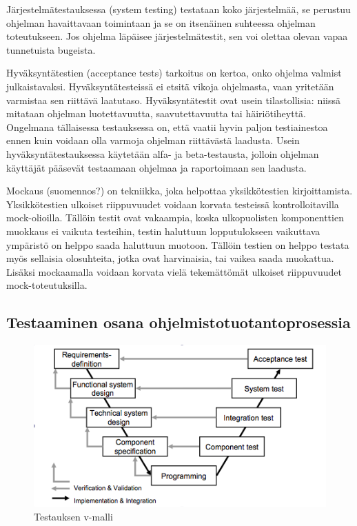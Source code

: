 Järjestelmätestauksessa (system testing) testataan koko järjestelmää, se perustuu ohjelman havaittavaan toimintaan ja se on itsenäinen suhteessa ohjelman toteutukseen. Jos ohjelma läpäisee järjestelmätestit, sen voi olettaa olevan vapaa tunnetuista bugeista. \cite[418-421]{testing}

Hyväksyntätestien (acceptance tests) tarkoitus on kertoa, onko ohjelma valmist julkaistavaksi. Hyväksyntätesteissä ei etsitä vikoja ohjelmasta, vaan yritetään varmistaa sen riittävä laatutaso. Hyväksyntätestit ovat usein tilastollisia: niissä mitataan ohjelman luotettavuutta, saavutettavuutta tai häiriötiheyttä. Ongelmana tällaisessa testauksessa on, että vaatii hyvin paljon testiainestoa ennen kuin voidaan olla varmoja ohjelman riittävästä laadusta. Usein hyväksyntätestauksessa käytetään alfa- ja beta-testausta, jolloin ohjelman käyttäjät pääsevät testaamaan ohjelmaa ja raportoimaan sen laadusta. \cite[421-423]{testing}

Mockaus (suomennos?) on tekniikka, joka helpottaa yksikkötestien kirjoittamista. Yksikkötestien ulkoiset riippuvuudet voidaan korvata testeissä kontrolloitavilla mock-olioilla. Tällöin testit ovat vakaampia, koska ulkopuolisten komponenttien muokkaus ei vaikuta testeihin, testin haluttuun lopputulokseen vaikuttava ympäristö on helppo saada haluttuun muotoon. Tällöin testien on helppo testata myös sellaisia olosuhteita, jotka ovat harvinaisia, tai vaikea saada muokattua. Lisäksi mockaamalla voidaan korvata vielä tekemättömät ulkoiset riippuvuudet mock-toteutuksilla. \cite{mocking}

\subsection{Testaaminen osana ohjelmistotuotantoprosessia}

\begin{figure}[htb]
\includegraphics[width=130mm]{v_model.png}
\caption{Testauksen v-malli} \label{v_model}
\end{figure}

